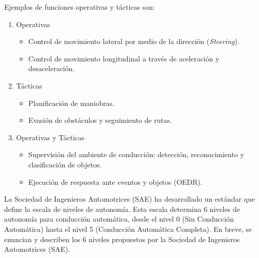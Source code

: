 Ejemplos de funciones operativas y tácticas son:
\begin{enumerate}
\item Operativas
    \begin{itemize}
        \item Control de movimiento lateral por medio de la dirección (\textit{Steering}).
        \item Control de movimiento longitudinal a través de aceleración y desaceleración.
    \end{itemize}
\item Tácticas
    \begin{itemize}
        \item Planificación de maniobras.
        \item Evasión de obstáculos y seguimiento de rutas.
    \end{itemize}
\item Operativas y Tácticas
    \begin{itemize}
        \item Supervisión del ambiente de conducción: detección,  reconocimiento y  clasificación de objetos.
        \item Ejecución de respuesta ante eventos y objetos (OEDR).
    \end{itemize}
\end{enumerate}

La Sociedad de Ingenieros Automotrices (SAE) ha desarrollado un estándar que define la escala de niveles de autonomía. Esta escala determina 6 niveles de autonomía para conducción automática,  desde el nivel 0 (Sin Conducción Automática) hasta el nivel 5 (Conducción Automática Completa)\cite{sae2021surface}. En breve, se enuncian y describen los 6 niveles propuestos por la Sociedad de Ingenieros Automotrices (SAE).

